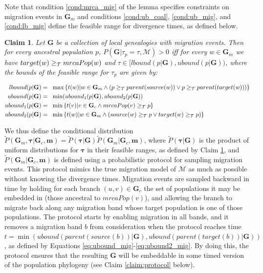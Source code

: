 \documentclass[11pt]{article}
\newcommand{\vect}[1]{\boldsymbol{\mathbf{#1}}}
\newcommand{\M}{\mathcal{M}}
\newcommand{\G}{\vect{G}}
\newcommand{\Pref}{\widetilde{P}}
\newcommand{\1}{\mathbbm{1}}
\newcommand{\Gc}{\G_c}
\newcommand{\Gm}{\G_m}
\newtheorem{claim}{Claim}
\newcommand{\taus}{\vect\tau}
\newcommand{\migs}{\vect{m}}
\begin{document}
Note that condition \ref{cond:mrca_mig} of the lemma specifies constraints on migration events in $\Gm$ and conditions \ref{cond:ub_coal}, \ref{cond:ub_mig}, and \ref{cond:lb_mig}
define the feasible range for divergence times, as defined below.
%
%
\begin{claim}\label{claim:tau_bound_mig}
 Let $\G$ be a  collection of local genealogies with migration events. Then for every ancestral population $p$, $P(\G|\tau_p=\tau,\M)>0$ iff for every $w\in\Gm$ we have $target(w)\geq_{\mathcal{T}} mrcaPop(w)$
 and   $\tau \in [lbound(p|\G) , ubound(p|\G) )$, where the bounds of the feasible range for $\tau_p$
 are given by:
 \begin{small}
 \begin{align}
  lbound(p|\G)   =~~ & \max\left\{t(w)| w\in \Gm \wedge ( p\anc parent(source(w)) \vee p\anc parent(target(w))) \right\} \label{eq:lbound_mig}\\
  ubound(p|\G)   =~~ & \min(ubound_1(p|\G) , ubound_2(p|\G)) \label{eq:ubound_mig}  \\
  ubound_1(p|\G) =~~ & \min\left\{t(v)| v\in \Gc \wedge mrcaPop(v)\anc p\right\} \label{eq:ubound1_mig}\\
  ubound_2(p|\G) =~~ & \min\left\{t(w)| w\in \Gm \wedge ( source(w)\anc p \vee target(w)\anc p) \right\} \label{eq:ubound2_mig} %
 \end{align}
 \end{small}
\end{claim}

We thus define the conditional distribution $\Pref(\Gm,\taus|\Gc,\migs)=\Pref(\taus|\G)\Pref(\Gm|\Gc,\migs)$,
where $\Pref(\taus|\G)$ is the product of uniform distributions for $\taus$ in their feasible ranges, as defined by Claim \ref{claim:tau_bound_mig},
and $\Pref(\Gm|\Gc,\migs)$ is defined using a probabilistic protocol for sampling migration events.
%
This protocol mimics the true migration model of $\M$ as much as possible without knowing the divergence times.
% 
Migration events are sampled backward in time by holding for each branch $(u,v)\in\Gc$ the set of populations it may be embedded in (those ancestral to $mrcaPop(v)$),
and allowing the branch to migrate back along any migration band whose target population is one of those populations.
%
The protocol starts by enabling migration in all bands, and it removes a migration band $b$ from consideration when the protocol reaches time
$t=\min\left(ubound(parent(source(b))|\G),ubound(parent(target(b))|\G)\right)$, as defined by Equations \ref{eq:ubound_mig}-\ref{eq:ubound2_mig}.
%
By doing this, the protocol ensures that the resulting $\G$ will be embeddable in some timed version of the population phylogeny (see Claim \ref{claim:protocol} below).
\end{document}
